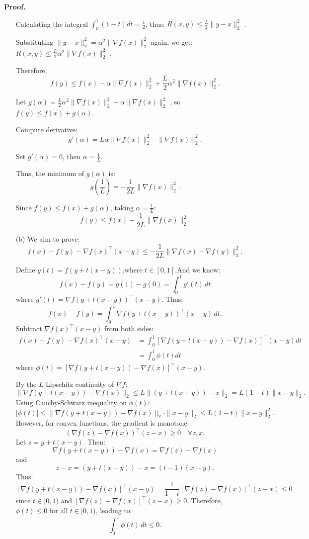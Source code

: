 \documentclass[a4paper, 11pt]{article}
\newenvironment{solution}
    {\textbf{Proof.}}
    {}
\begin{document}
\begin{solution}
\begin{enumerate}
Calculating the integral \( \int_0^1 (1 - t) dt = \frac{1}{2} \), thus: \( R(x, y) \leq \frac{L}{2} \|y - x\|_2^2 \) . 
	
Substituting \( \|y - x\|_2^2 = \alpha^2 \|\nabla f(x)\|_2^2 \) again, we get: \( R(x, y) \leq \frac{L}{2} \alpha^2 \|\nabla f(x)\|_2^2 \) . 

  
Therefore, 
$$ f(y) \leq f(x) - \alpha \|\nabla f(x)\|_2^2 + \frac{L}{2} \alpha^2 \|\nabla f(x)\|_2^2 .$$
 
Let  \(g(\alpha) = \frac{L}{2} \alpha^2 \|\nabla f(x)\|_2^2 - \alpha \|\nabla f(x)\|_2^2  \) ,	so  \(f(y) \leq f(x) + g(\alpha)\).

Compute derivative:  
$$ g'(\alpha) = L \alpha \|\nabla f(x)\|_2^2 - \|\nabla f(x)\|_2^2 .$$  

Set  \(g'(\alpha) = 0 \), then \( \alpha = \frac{1}{L} \).

Thus, the minimum of  \(g(\alpha)\)  is: 
 $$g\left( \frac{1}{L} \right) = -\frac{1}{2L} \|\nabla f(x)\|_2^2 .$$  

Since  \(f(y) \leq f(x) + g(\alpha)\), taking  \(\alpha = \frac{1}{L}\):
$$ f(y) \leq f(x) - \frac{1}{2L} \|\nabla f(x)\|_2^2. $$  
 
	
\item[(b)] 
We aim to prove:
$$
f(x) - f(y) - \nabla f(x)^\top (x - y) \leq -\frac{1}{2L} \|\nabla f(x) - \nabla f(y)\|_2^2.
$$

Define \( g(t) = f(y + t(x - y)) \),where \( t \in [0, 1] \).And we know:
$$
f(x) - f(y) = g(1) - g(0) = \int_0^1 g'(t) \, dt
$$
where \( g'(t) = \nabla f(y + t(x - y))^\top (x - y) \). Thus:
$$
f(x) - f(y) = \int_0^1 \nabla f(y + t(x - y))^\top (x - y) \, dt.
$$
Subtract \( \nabla f(x)^\top (x - y) \) from both sides:
\begin{align*}
	f(x) - f(y) - \nabla f(x)^{\top} (x - y) 
	&= \int_0^1 \left[ \nabla f(y + t(x - y)) - \nabla f(x) \right]^{\top} (x - y)  dt \\
	&= \int_0^1 \phi(t)  dt 
\end{align*}
where $\phi(t) = \left[ \nabla f(y + t(x - y)) - \nabla f(x) \right]^{\top} (x - y)$.

By the \( L \)-Lipschitz continuity of \( \nabla f \):
$$
\|\nabla f(y + t(x - y)) - \nabla f(x)\|_2 \leq L \|(y + t(x - y)) - x\|_2 = L (1 - t) \|x - y\|_2.
$$
Using Cauchy-Schwarz inequality on \( \phi(t) \):
$$
|\phi(t)| \leq \|\nabla f(y + t(x - y)) - \nabla f(x)\|_2 \cdot \|x - y\|_2 \leq L (1 - t) \|x - y\|_2^2.
$$
However, for convex functions, the gradient is monotone:
$$
(\nabla f(z) - \nabla f(x))^\top (z - x) \geq 0 \quad \forall z, x.
$$
Let \( z = y + t(x - y) \). Then:
$$
\nabla f(y + t(x - y)) - \nabla f(x) = \nabla f(z) - \nabla f(x)
$$
and
$$
z - x = (y + t(x - y)) - x = (t - 1)(x - y).
$$
Thus:
$$
\left[ \nabla f(y + t(x - y)) - \nabla f(x) \right]^\top (x - y) = \frac{1}{1 - t} \left[ \nabla f(z) - \nabla f(x) \right]^\top (z - x) \leq 0
$$
since \( t \in [0, 1) \) and \( \left[ \nabla f(z) - \nabla f(x) \right]^\top (z - x) \geq 0 \). Therefore, \( \phi(t) \leq 0 \) for all \( t \in [0, 1) \), leading to:
$$
\int_0^1 \phi(t) \, dt \leq 0.
$$


\end{enumerate}
\end{solution}
\end{document}
